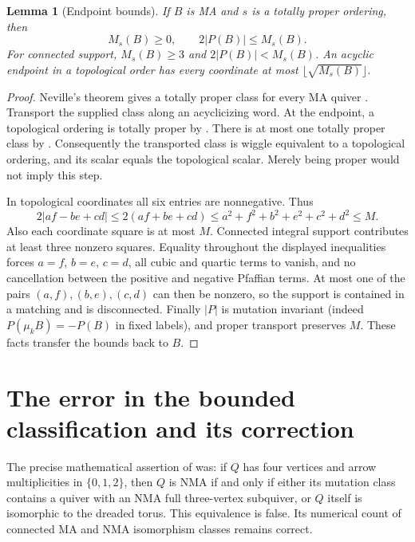 \documentclass[11pt]{amsart}
\newtheorem{lemma}[theorem]{Lemma}
\theoremstyle{definition}\newtheorem{definition}[theorem]{Definition}
\theoremstyle{remark}\newtheorem{remark}[theorem]{Remark}
\begin{document}
\begin{lemma}[Endpoint bounds]\label{lem:endpoint}
If $B$ is MA and $s$ is a totally proper ordering, then
\begin{equation}\label{eq:endpoint}
 M_s(B)\ge0,\qquad 2|P(B)|\le M_s(B).
\end{equation}
For connected support, $M_s(B)\ge3$ and $2|P(B)|<M_s(B)$. An acyclic endpoint in a topological order has every coordinate at most $\lfloor\sqrt{M_s(B)}\rfloor$.
\end{lemma}
\begin{proof}
Neville's theorem gives a totally proper class for every MA quiver \cite[Theorem~1.1]{Neville}. Transport the supplied class along an acyclicizing word. At the endpoint, a topological ordering is totally proper by \cite[Remark~1.2]{Neville}. There is at most one totally proper class by \cite[Theorem~14.3]{FN}. Consequently the transported class is wiggle equivalent to a topological ordering, and its scalar equals the topological scalar. Merely being proper would not imply this step.

In topological coordinates all six entries are nonnegative. Thus
\[
 2|af-be+cd|\le2(af+be+cd)
 \le a^2+f^2+b^2+e^2+c^2+d^2\le M.
\]
Also each coordinate square is at most $M$. Connected integral support contributes at least three nonzero squares. Equality throughout the displayed inequalities forces $a=f$, $b=e$, $c=d$, all cubic and quartic terms to vanish, and no cancellation between the positive and negative Pfaffian terms. At most one of the pairs $(a,f),(b,e),(c,d)$ can then be nonzero, so the support is contained in a matching and is disconnected. Finally $|P|$ is mutation invariant (indeed $P(\mu_kB)=-P(B)$ in fixed labels), and proper transport preserves $M$. These facts transfer the bounds back to $B$.
\end{proof}

\section{The error in the bounded classification and its correction}\label{sec:correction}
The precise mathematical assertion of \cite[Theorem~2.9]{AHJL} was: if $Q$ has four vertices and arrow multiplicities in $\{0,1,2\}$, then $Q$ is NMA if and only if either its mutation class contains a quiver with an NMA full three-vertex subquiver, or $Q$ itself is isomorphic to the dreaded torus. This equivalence is false. Its numerical count of connected MA and NMA isomorphism classes remains correct.
\end{document}
